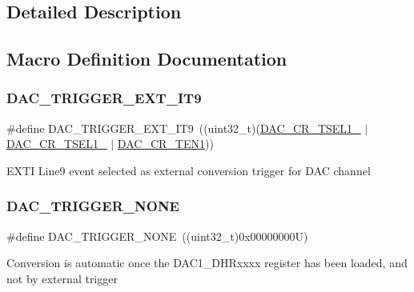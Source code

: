 \subsection{Detailed Description}


\subsection{Macro Definition Documentation}
\mbox{\label{group___d_a_c__trigger__selection_gaf7d4babe0dbcd473496ea913ee060ebb}} 
\subsubsection{\texorpdfstring{DAC\_TRIGGER\_EXT\_IT9}{DAC\_TRIGGER\_EXT\_IT9}}
{\footnotesize\ttfamily \#define D\+A\+C\+\_\+\+T\+R\+I\+G\+G\+E\+R\+\_\+\+E\+X\+T\+\_\+\+I\+T9~((uint32\+\_\+t)(\mbox{\hyperlink{group___peripheral___registers___bits___definition_gaa625d7638422e90a616ac93edd4bf408}{D\+A\+C\+\_\+\+C\+R\+\_\+\+T\+S\+E\+L1\+\_}} $\vert$ \mbox{\hyperlink{group___peripheral___registers___bits___definition_ga265e32c4fc43310acdf3ebea01376766}{D\+A\+C\+\_\+\+C\+R\+\_\+\+T\+S\+E\+L1\+\_}} $\vert$ \mbox{\hyperlink{group___peripheral___registers___bits___definition_ga998aa4fd791ea2f4626df6ddc8fc7109}{D\+A\+C\+\_\+\+C\+R\+\_\+\+T\+E\+N1}}))}

E\+X\+TI Line9 event selected as external conversion trigger for D\+AC channel \mbox{\label{group___d_a_c__trigger__selection_ga9b7e1a1ac776ce97f65ffacb99e8f01e}} 
\subsubsection{\texorpdfstring{DAC\_TRIGGER\_NONE}{DAC\_TRIGGER\_NONE}}
{\footnotesize\ttfamily \#define D\+A\+C\+\_\+\+T\+R\+I\+G\+G\+E\+R\+\_\+\+N\+O\+NE~((uint32\+\_\+t)0x00000000\+U)}

Conversion is automatic once the D\+A\+C1\+\_\+\+D\+H\+Rxxxx register has been loaded, and not by external trigger \mbox{\label{group___d_a_c__trigger__selection_gaffd98a8de78794c9ffa837598977c6a7}} 
